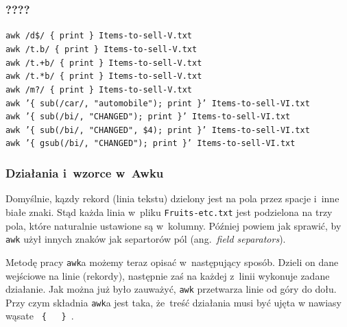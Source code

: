 \documentclass[10pt,t]{beamer}
\begin{document}
\begin{frame}
  \frametitle{????}


  \texttt{awk /d\$/ \{ print \} Items-to-sell-V.txt} \\
  \texttt{awk /t.b/ \{ print \} Items-to-sell-V.txt} \\
  \texttt{awk /t.+b/ \{ print \} Items-to-sell-V.txt} \\
  \texttt{awk /t.*b/ \{ print \} Items-to-sell-V.txt} \\
  \texttt{awk /m?/ \{ print \} Items-to-sell-V.txt} \\
  \texttt{awk '\{ sub(/car/, "automobile"); print \}' Items-to-sell-VI.txt} \\
  \texttt{awk '\{ sub(/bi/, "CHANGED"); print \}' Items-to-sell-VI.txt} \\
  \texttt{awk '\{ sub(/bi/, "CHANGED", \$4); print \}' Items-to-sell-VI.txt} \\
  \texttt{awk '\{ gsub(/bi/, "CHANGED"); print \}' Items-to-sell-VI.txt} \\

\end{frame}





\begin{frame}
  \frametitle{Działania i~wzorce w~Awku}


  Domyślnie, kązdy rekord (linia tekstu) dzielony jest na pola przez
  spacje i~inne białe znaki. Stąd każda linia w~pliku
  \texttt{Fruits-etc.txt} jest podzielona na trzy pola, które naturalnie
  ustawione są w~kolumny. Później powiem jak sprawić, by \texttt{awk} użył
  innych znaków jak separtorów pól (ang.~\textit{field separators}).

  Metodę pracy \texttt{awk}a możemy teraz opisać w~następujący sposób.
  Dzieli on dane wejściowe na linie (rekordy), następnie zaś na każdej
  z~linii wykonuje zadane działanie. Jak można już było zauważyć,
  \texttt{awk} przetwarza linie od góry do dołu. Przy czym składnia
  \texttt{awk}a jest taka, że~treść działania musi być ujęta w nawiasy
  wąsate \texttt{ \{ { } \} }.

\end{frame}
\end{document}
